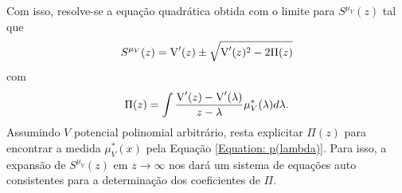 Com isso, resolve-se a equação quadrática obtida com o limite para $S^{\mu_V}(z)$ tal que
\begin{equation}
	S^{\mu_V}(z) = \operatorname{V}'(z) \pm \sqrt{\operatorname{V}'(z)^2 - 2 \Pi(z) }
	\label{Equation: Resolvent}
\end{equation}
com $$\Pi(z) = \int \frac{\operatorname{V}'(z) - \operatorname{V}'(\lambda)}{z - \lambda} \mu^*_V(\lambda) d\lambda.$$ Assumindo $V$ potencial polinomial arbitrário, resta explicitar $\Pi(z)$ para encontrar a medida $\mu^{*}_{V}(x)$ pela Equação \eqref{Equation: p(lambda)}. Para isso, a expansão de $S^{\mu_V}(z)$ em $z \rightarrow \infty$ nos dará um sistema de equações auto consistentes para a determinação dos coeficientes de $\Pi$.



